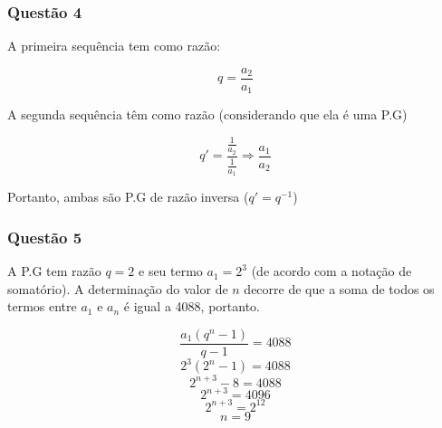 \subsubsection*{Questão 4}

\hrulefill

A primeira sequência tem como razão:

\[q = \frac{a_{2}}{a_{1}}\]

A segunda sequência têm como razão (considerando que ela é uma P.G)

\[q' = \frac{\frac{1}{a_{2}}}{\frac{1}{a_{1}}} \Rightarrow \frac{a_{1}}{a_{2}}\]

Portanto, ambas são P.G de razão inversa ($q' = q^{-1}$)

\subsubsection*{Questão 5}

\hrulefill

A P.G tem razão $q = 2$ e seu termo $a_{1} = 2^{3}$ (de acordo com a notação de somatório). A determinação do valor de $n$ decorre de que a soma de todos os termos entre $a_{1}$ e $a_{n}$ é igual a 4088, portanto.

\[\frac{a_{1} (q^{n} - 1)}{q - 1} = 4088\]
\[2^{3}(2^{n} - 1) = 4088\]
\[2^{n+3} - 8 = 4088\]
\[2^{n+3} = 4096\]
\[2^{n+3} = 2^{12}\]
\[n = 9\]
